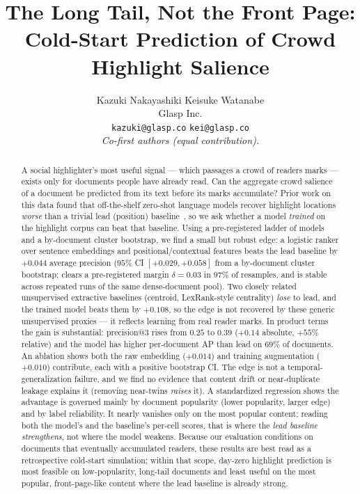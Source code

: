 \documentclass[11pt]{article}
\title{The Long Tail, Not the Front Page:\\
Cold-Start Prediction of Crowd Highlight Salience}
\author{
  Kazuki Nakayashiki \quad Keisuke Watanabe \\[3pt]
  Glasp Inc. \\
  \texttt{kazuki@glasp.co} \quad \texttt{kei@glasp.co} \\[3pt]
  {\small\itshape Co-first authors (equal contribution).}
}
\date{}
\begin{document}
\maketitle

\begin{abstract}
A social highlighter's most useful signal --- which passages a crowd of readers marks ---
exists only for documents people have already read. Can the aggregate crowd salience of a
document be predicted from its text before its marks accumulate? Prior work on this data found
that off-the-shelf zero-shot language models recover highlight locations \emph{worse} than a
trivial lead (position) baseline~\cite{nakayashiki2026selection}, so we ask whether a model
\emph{trained} on the highlight corpus can beat that baseline. Using a pre-registered ladder of
models and a by-document cluster bootstrap, we find a small but robust edge: a logistic ranker
over sentence embeddings and positional/contextual features beats the lead baseline by
$+0.044$ average precision ($95\%$ CI $[+0.029,+0.058]$ from a by-document cluster bootstrap;
clears a pre-registered margin $\delta{=}0.03$ in $97\%$ of resamples, and is stable across
repeated runs of the same dense-document pool). Two closely related unsupervised extractive
baselines (centroid, LexRank-style centrality) \emph{lose} to lead, and the trained model beats
them by $+0.108$, so the edge is not recovered by these generic unsupervised proxies --- it
reflects learning from real reader marks. In product terms the gain is substantial: precision@3
rises from $0.25$ to $0.39$ ($+0.14$ absolute, $+55\%$ relative) and the model has higher
per-document AP than lead on $69\%$ of documents. An ablation shows both the raw embedding
($+0.014$) and training augmentation ($+0.010$) contribute, each with a positive bootstrap CI. The edge is not
a temporal-generalization failure, and we find no evidence that content drift or near-duplicate
leakage explains it (removing near-twins \emph{raises} it). A standardized regression shows the
advantage is governed mainly by document popularity (lower popularity, larger edge) and by label
reliability. It nearly vanishes only on the most popular content; reading both the model's and
the baseline's per-cell scores, that is where the \emph{lead baseline strengthens}, not where
the model weakens. Because our
evaluation conditions on documents that eventually accumulated readers, these results are best
read as a retrospective cold-start simulation; within that scope, day-zero highlight prediction
is most feasible on low-popularity, long-tail documents and least useful on the most popular,
front-page-like content where the lead baseline is already strong.
\end{abstract}
\end{document}
